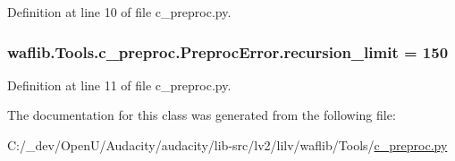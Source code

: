Definition at line 10 of file c\+\_\+preproc.\+py.

\subsubsection[{\texorpdfstring{recursion\+\_\+limit}{recursion_limit}}]{ waflib.\+Tools.\+c\+\_\+preproc.\+Preproc\+Error.\+recursion\+\_\+limit = 150\hspace{0.3cm}{\ttfamily [static]}}\hypertarget{classwaflib_1_1_tools_1_1c__preproc_1_1_preproc_error_a60c23aa10c0c58d1b4525a985dd9306d}{}\label{classwaflib_1_1_tools_1_1c__preproc_1_1_preproc_error_a60c23aa10c0c58d1b4525a985dd9306d}


Definition at line 11 of file c\+\_\+preproc.\+py.



The documentation for this class was generated from the following file\+:\begin{DoxyCompactItemize}
\item 
C\+:/\+\_\+dev/\+Open\+U/\+Audacity/audacity/lib-\/src/lv2/lilv/waflib/\+Tools/\hyperlink{lilv_2waflib_2_tools_2c__preproc_8py}{c\+\_\+preproc.\+py}\end{DoxyCompactItemize}
